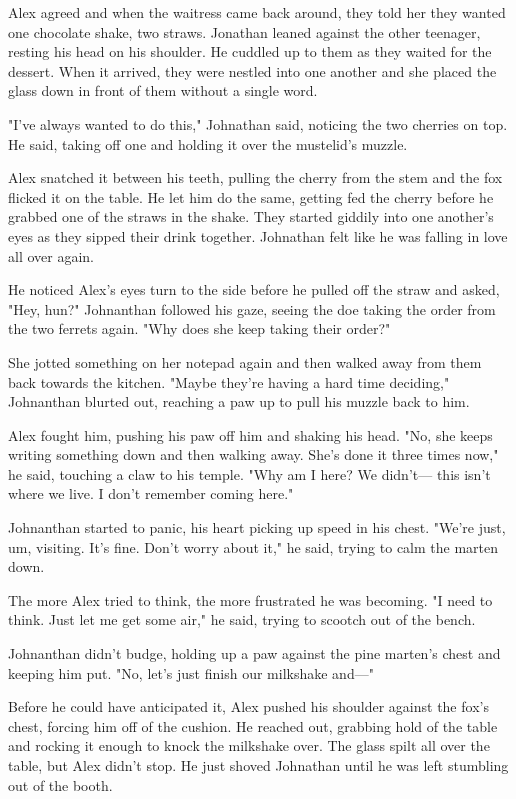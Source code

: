 Alex agreed and when the waitress came back around, they told her they wanted one chocolate shake, two straws. Jonathan leaned against the other teenager, resting his head on his shoulder. He cuddled up to them as they waited for the dessert. When it arrived, they were nestled into one another and she placed the glass down in front of them without a single word.

"I've always wanted to do this," Johnathan said, noticing the two cherries on top. He said, taking off one and holding it over the mustelid's muzzle.

Alex snatched it between his teeth, pulling the cherry from the stem and the fox flicked it on the table. He let him do the same, getting fed the cherry before he grabbed one of the straws in the shake. They started giddily into one another's eyes as they sipped their drink together. Johnathan felt like he was falling in love all over again.

He noticed Alex's eyes turn to the side before he pulled off the straw and asked, "Hey, hun?" Johnanthan followed his gaze, seeing the doe taking the order from the two ferrets again. "Why does she keep taking their order?"

She jotted something on her notepad again and then walked away from them back towards the kitchen. "Maybe they're having a hard time deciding," Johnanthan blurted out, reaching a paw up to pull his muzzle back to him.

Alex fought him, pushing his paw off him and shaking his head. "No, she keeps writing something down and then walking away. She's done it three times now," he said, touching a claw to his temple. "Why am I here? We didn't--- this isn't where we live. I don't remember coming here."

Johnanthan started to panic, his heart picking up speed in his chest. "We're just, um, visiting. It's fine. Don't worry about it," he said, trying to calm the marten down.

The more Alex tried to think, the more frustrated he was becoming. "I need to think. Just let me get some air," he said, trying to scootch out of the bench.

Johnanthan didn't budge, holding up a paw against the pine marten's chest and keeping him put. "No, let's just finish our milkshake and---"

Before he could have anticipated it, Alex pushed his shoulder against the fox's chest, forcing him off of the cushion. He reached out, grabbing hold of the table and rocking it enough to knock the milkshake over. The glass spilt all over the table, but Alex didn't stop. He just shoved Johnathan until he was left stumbling out of the booth.

